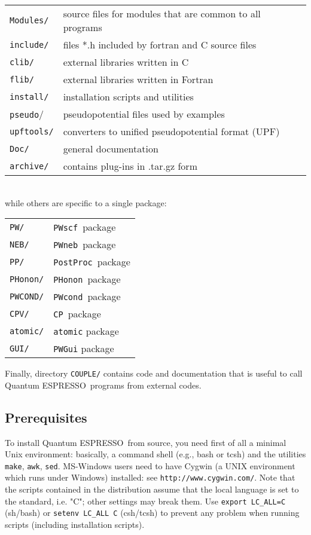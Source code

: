 \documentclass[12pt,a4paper]{article}
\def\qe{{\sc Quantum ESPRESSO}}
\def\PWscf{\texttt{PWscf}}
\def\PHonon{\texttt{PHonon}}
\def\CP{\texttt{CP}}
\def\PostProc{\texttt{PostProc}}
\def\NEB{\texttt{PWneb}} %
\def\make{\texttt{make}}
\begin{document}
\begin{tabular}{ll}
\texttt{Modules/} &  source files for modules that are common to all programs\\
\texttt{include/} &  files *.h included by fortran and C source files\\
\texttt{clib/}    &  external libraries written in C\\
\texttt{flib/}    &  external libraries written in Fortran\\
\texttt{install/} &  installation scripts and utilities\\
\texttt{pseudo}/  &  pseudopotential files used by examples\\
\texttt{upftools/}&  converters to unified pseudopotential format (UPF)\\
\texttt{Doc/}     &  general documentation\\
\texttt{archive/} &  contains plug-ins in .tar.gz form\\
\end{tabular}
\\
while others are specific to a single package:

\begin{tabular}{ll}
\texttt{PW/}      & \PWscf\ package\\
\texttt{NEB/}     & \NEB\ package\\
\texttt{PP/}      & \PostProc\ package\\
\texttt{PHonon/}  & \PHonon\ package\\
\texttt{PWCOND/}  & \texttt{PWcond}\ package\\
\texttt{CPV/}     & \CP\ package\\
\texttt{atomic/}  & \texttt{atomic} package\\
\texttt{GUI/}     & \texttt{PWGui} package\
\end{tabular}

Finally, directory \texttt{COUPLE/} contains code and documentation
that is useful to call \qe\ programs from external codes.
\subsection{Prerequisites}
\label{Sec:Installation}

To install \qe\ from source, you need first of all a minimal Unix 
environment: basically, a command shell (e.g.,
bash or tcsh) and the utilities \make, \texttt{awk}, \texttt{sed}.
 MS-Windows users need to have Cygwin (a UNIX environment which
 runs under Windows) installed:
see \texttt{http://www.cygwin.com/}. Note that the scripts contained 
in the distribution assume that the local  language is set to the 
standard, i.e. "C"; other settings 
may break them. Use \texttt{export LC\_ALL=C} (sh/bash) or
\texttt{setenv LC\_ALL C} (csh/tcsh) to prevent any problem 
when running scripts (including installation scripts).
\end{document}
